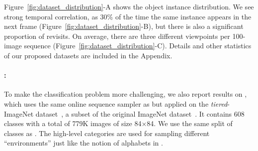 Figure~\ref{fig:dataset_distribution}-A shows the object instance distribution. We see strong
temporal correlation, as 30\% of the time the same instance appears in the next frame
(Figure~\ref{fig:dataset_distribution}-B), but there is also a significant proportion of revisits.
On average, there are three different viewpoints per 100-image sequence
(Figure~\ref{fig:dataset_distribution}-C). Details and other statistics of our proposed datasets are
included in the Appendix.

\vspace{-0.1in}
\paragraph{\ourimg{}:} To make the classification problem more challenging, we also report results 
on \ourimg, which uses the same online sequence sampler as \ourchar{} but applied on the \textit{tiered}-ImageNet 
dataset~\citep{fewshotssl}, a subset of the original ImageNet dataset~\citep{imagenet}.
It contains 608 classes with a total of 779K images of size 84$\times$84.
We use the same split of classes as \citet{fewshotssl}. The high-level categories are used for
sampling different ``environments'' just like the notion of alphabets in \ourchar{}.

